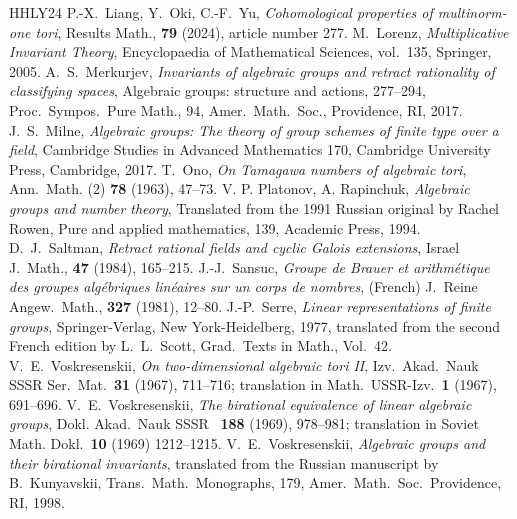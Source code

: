 \documentclass[12pt]{amsart}
\theoremstyle{plain}
\theoremstyle{definition}
\numberwithin{thm}{section}
\numberwithin{equation}{section}
\begin{document}
\begin{thebibliography}{HHLY24}
P.-X.~Liang, Y.~Oki, C.-F.~Yu, \emph{Cohomological properties of multinorm-one tori}, Results Math., \textbf{79} (2024), article number 277. 
M.~Lorenz, \emph{Multiplicative Invariant Theory}, Encyclopaedia of Mathematical Sciences, vol.~135, Springer, 2005. 
A.~S.~Merkurjev, \emph{Invariants of algebraic groups and retract rationality of classifying spaces}, Algebraic groups: structure and actions, 277--294, Proc.~Sympos.~Pure Math., 94, Amer.~Math.~Soc., Providence, RI, 2017.
J.~S.~Milne, \emph{Algebraic groups: The theory of group schemes of finite type over a field}, Cambridge Studies in Advanced Mathematics 170, Cambridge University Press, Cambridge, 2017. 
T.~Ono, \emph{On Tamagawa numbers of algebraic tori}, Ann.~Math. (2) \textbf{78} (1963), 47--73. 
V. P. Platonov, A. Rapinchuk, {\it Algebraic groups and number theory}, 
Translated from the 1991 Russian original by Rachel Rowen, 
Pure and applied mathematics, 139, Academic Press, 1994. 
D.~J.~Saltman, \emph{Retract rational fields and cyclic Galois extensions}, Israel J.~Math., \textbf{47} (1984), 165--215. 
J.-J.~Sansuc, \emph{Groupe de Brauer et arithm{\'e}tique des groupes alg{\'e}briques lin{\'e}aires sur un corps de nombres}, (French) J.~Reine Angew.~Math., \textbf{327} (1981), 12--80. 
J.-P.~Serre, \emph{Linear representations of finite groups}, Springer-Verlag, New York-Heidelberg, 1977, translated from the second French edition by L.~L.~Scott, Grad.~Texts in Math., Vol.~42. 
V.~E.~Voskresenskii, \emph{On two-dimensional algebraic tori II}, Izv.~Akad.~Nauk SSSR Ser.~Mat.~\textbf{31} (1967), 711--716; translation in Math.~USSR-Izv.~\textbf{1} (1967), 691--696. 
V.~E.~Voskresenskii, \emph{The birational equivalence of linear algebraic groups}, Dokl. Akad.~Nauk SSSR ~\textbf{188} (1969), 978--981; translation in Soviet Math. Dokl.~\textbf{10} (1969) 1212–1215.
V.~E.~Voskresenskii, \emph{Algebraic groups and their birational invariants}, translated from the Russian manuscript by B.~Kunyavskii, Trans.~Math.~Monographs, 179, Amer.~Math.~Soc.~Providence, RI, 1998. 
\end{thebibliography}
\end{document}
